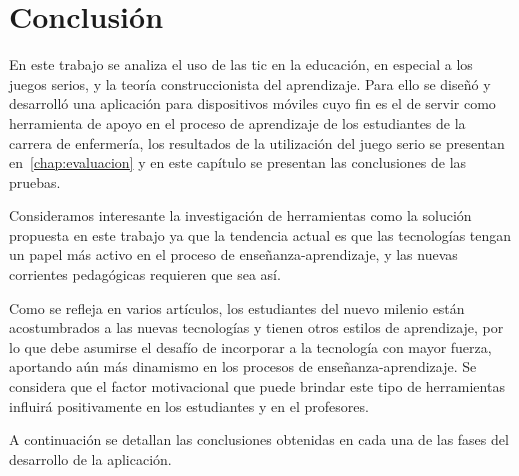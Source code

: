 \chapter{Conclusión}
\label{chap:conclusion}


En este trabajo se analiza el uso de las \Gls{tic} en la educación, en especial
a los juegos serios, y la teoría construccionista del aprendizaje. Para ello se
diseñó y desarrolló una aplicación para dispositivos móviles cuyo fin es el de
servir como herramienta de apoyo en el proceso de aprendizaje de los estudiantes
de la carrera de enfermería, los resultados de la utilización del juego serio se
presentan en~\ref{chap:evaluacion} y en este capítulo se presentan las
conclusiones de las pruebas.

Consideramos interesante la investigación de herramientas como la solución
propuesta en este trabajo ya que la tendencia actual es que las tecnologías
tengan un papel más activo en el proceso de enseñanza-aprendizaje, y las nuevas
corrientes pedagógicas requieren que sea así. 

Como se refleja en varios artículos, los estudiantes del nuevo milenio están
acostumbrados a las nuevas tecnologías y tienen otros estilos de aprendizaje,
por lo que debe asumirse el desafío de incorporar a la tecnología con mayor
fuerza, aportando aún más dinamismo en los procesos de enseñanza-aprendizaje. Se
considera que el factor motivacional que puede brindar este tipo de herramientas
influirá positivamente en los estudiantes y en el profesores.

A continuación se detallan las conclusiones obtenidas en cada una de las fases
del desarrollo de la aplicación.




%
%
%



